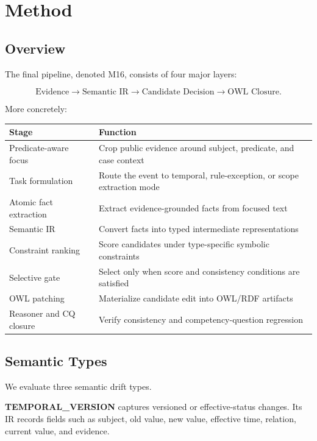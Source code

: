 \documentclass[11pt]{article}
\begin{document}
\section{Method}

\subsection{Overview}

The final pipeline, denoted M16, consists of four major layers:

\[
\text{Evidence} \rightarrow \text{Semantic IR} \rightarrow \text{Candidate Decision} \rightarrow \text{OWL Closure}.
\]

More concretely:

\begin{center}
\begin{tabular}{ll}
\toprule
Stage & Function \\
\midrule
Predicate-aware focus & Crop public evidence around subject, predicate, and case context \\
Task formulation & Route the event to temporal, rule-exception, or scope extraction mode \\
Atomic fact extraction & Extract evidence-grounded facts from focused text \\
Semantic IR & Convert facts into typed intermediate representations \\
Constraint ranking & Score candidates under type-specific symbolic constraints \\
Selective gate & Select only when score and consistency conditions are satisfied \\
OWL patching & Materialize candidate edit into OWL/RDF artifacts \\
Reasoner and CQ closure & Verify consistency and competency-question regression \\
\bottomrule
\end{tabular}
\end{center}

\subsection{Semantic Types}

We evaluate three semantic drift types.

\textbf{TEMPORAL\_VERSION} captures versioned or effective-status changes. Its IR records fields such as subject, old value, new value, effective time, relation, current value, and evidence.
\end{document}
